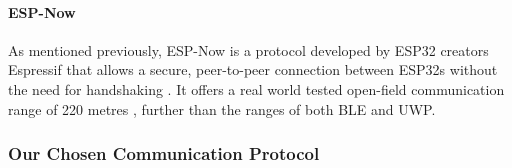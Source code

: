 \documentclass[12pt, a4paper]{report}
\begin{document}
{

\paragraph{ESP-Now}

As mentioned previously, ESP-Now is a protocol developed by ESP32 creators Espressif that allows a secure, peer-to-peer connection between ESP32s without the need for handshaking \cite{esp-now_overview}. It offers a real world tested open-field communication range of 220 metres \cite{random_nerd_tutorials}, further than the ranges of both BLE and UWP.



\subsubsection{Our Chosen Communication Protocol}

}
\end{document}
